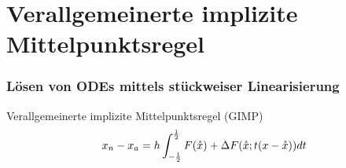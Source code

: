 \section[Problemstellung]{Verallgemeinerte implizite Mittelpunktsregel}
\begin{frame}[<+->]
\frametitle{Lösen von ODEs mittels stückweiser Linearisierung}
 \begin{block}{Verallgemeinerte implizite Mittelpunktsregel (GIMP)}
 \[
  x_n - x_a = h\int_{-\frac{1}{2}}^{\frac{1}{2}} F(\mathring{x}) + \Delta F(\mathring{x}; t(x-\mathring{x}))dt
 \]

\end{block}


\end{frame}
